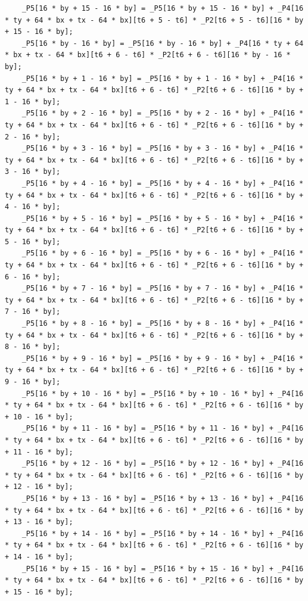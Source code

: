 \documentclass[msthesis,justified,copyright,final,numbers,sort&compress,
gsmodern,amstex,natbib]{uothesis}
\begin{document}
\begin{lstlisting}
    _P5[16 * by + 15 - 16 * by] = _P5[16 * by + 15 - 16 * by] + _P4[16 * ty + 64 * bx + tx - 64 * bx][t6 + 5 - t6] * _P2[t6 + 5 - t6][16 * by + 15 - 16 * by];
    _P5[16 * by - 16 * by] = _P5[16 * by - 16 * by] + _P4[16 * ty + 64 * bx + tx - 64 * bx][t6 + 6 - t6] * _P2[t6 + 6 - t6][16 * by - 16 * by];
    _P5[16 * by + 1 - 16 * by] = _P5[16 * by + 1 - 16 * by] + _P4[16 * ty + 64 * bx + tx - 64 * bx][t6 + 6 - t6] * _P2[t6 + 6 - t6][16 * by + 1 - 16 * by];
    _P5[16 * by + 2 - 16 * by] = _P5[16 * by + 2 - 16 * by] + _P4[16 * ty + 64 * bx + tx - 64 * bx][t6 + 6 - t6] * _P2[t6 + 6 - t6][16 * by + 2 - 16 * by];
    _P5[16 * by + 3 - 16 * by] = _P5[16 * by + 3 - 16 * by] + _P4[16 * ty + 64 * bx + tx - 64 * bx][t6 + 6 - t6] * _P2[t6 + 6 - t6][16 * by + 3 - 16 * by];
    _P5[16 * by + 4 - 16 * by] = _P5[16 * by + 4 - 16 * by] + _P4[16 * ty + 64 * bx + tx - 64 * bx][t6 + 6 - t6] * _P2[t6 + 6 - t6][16 * by + 4 - 16 * by];
    _P5[16 * by + 5 - 16 * by] = _P5[16 * by + 5 - 16 * by] + _P4[16 * ty + 64 * bx + tx - 64 * bx][t6 + 6 - t6] * _P2[t6 + 6 - t6][16 * by + 5 - 16 * by];
    _P5[16 * by + 6 - 16 * by] = _P5[16 * by + 6 - 16 * by] + _P4[16 * ty + 64 * bx + tx - 64 * bx][t6 + 6 - t6] * _P2[t6 + 6 - t6][16 * by + 6 - 16 * by];
    _P5[16 * by + 7 - 16 * by] = _P5[16 * by + 7 - 16 * by] + _P4[16 * ty + 64 * bx + tx - 64 * bx][t6 + 6 - t6] * _P2[t6 + 6 - t6][16 * by + 7 - 16 * by];
    _P5[16 * by + 8 - 16 * by] = _P5[16 * by + 8 - 16 * by] + _P4[16 * ty + 64 * bx + tx - 64 * bx][t6 + 6 - t6] * _P2[t6 + 6 - t6][16 * by + 8 - 16 * by];
    _P5[16 * by + 9 - 16 * by] = _P5[16 * by + 9 - 16 * by] + _P4[16 * ty + 64 * bx + tx - 64 * bx][t6 + 6 - t6] * _P2[t6 + 6 - t6][16 * by + 9 - 16 * by];
    _P5[16 * by + 10 - 16 * by] = _P5[16 * by + 10 - 16 * by] + _P4[16 * ty + 64 * bx + tx - 64 * bx][t6 + 6 - t6] * _P2[t6 + 6 - t6][16 * by + 10 - 16 * by];
    _P5[16 * by + 11 - 16 * by] = _P5[16 * by + 11 - 16 * by] + _P4[16 * ty + 64 * bx + tx - 64 * bx][t6 + 6 - t6] * _P2[t6 + 6 - t6][16 * by + 11 - 16 * by];
    _P5[16 * by + 12 - 16 * by] = _P5[16 * by + 12 - 16 * by] + _P4[16 * ty + 64 * bx + tx - 64 * bx][t6 + 6 - t6] * _P2[t6 + 6 - t6][16 * by + 12 - 16 * by];
    _P5[16 * by + 13 - 16 * by] = _P5[16 * by + 13 - 16 * by] + _P4[16 * ty + 64 * bx + tx - 64 * bx][t6 + 6 - t6] * _P2[t6 + 6 - t6][16 * by + 13 - 16 * by];
    _P5[16 * by + 14 - 16 * by] = _P5[16 * by + 14 - 16 * by] + _P4[16 * ty + 64 * bx + tx - 64 * bx][t6 + 6 - t6] * _P2[t6 + 6 - t6][16 * by + 14 - 16 * by];
    _P5[16 * by + 15 - 16 * by] = _P5[16 * by + 15 - 16 * by] + _P4[16 * ty + 64 * bx + tx - 64 * bx][t6 + 6 - t6] * _P2[t6 + 6 - t6][16 * by + 15 - 16 * by];

\end{lstlisting}
\end{document}
